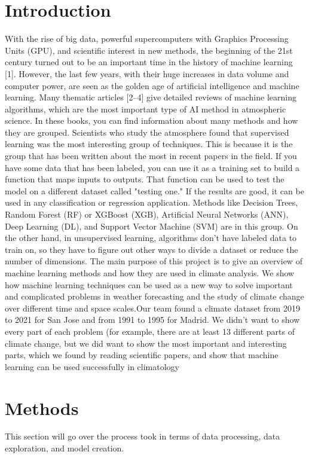 \documentclass[conference]{IEEEtran}
\begin{document}
\section{Introduction}
With the rise of big data, powerful supercomputers with Graphics Processing Units (GPU), and scientific interest in new methods, the beginning of the 21st century turned out to be an important time in the history of machine learning [1]. However, the last few years, with their huge increases in data volume and computer power, are seen as the golden age of artificial intelligence and machine learning.
Many thematic articles [2–4] give detailed reviews of machine learning algorithms, which are the most important type of AI method in atmospheric science. In these books, you can find information about many methods and how they are grouped. Scientists who study the atmosphere found that supervised learning was the most interesting group of techniques. This is because it is the group that has been written about the most in recent papers in the field. If you have some data that has been labeled, you can use it as a training set to build a function that maps inputs to outputs. That function can be used to test the model on a different dataset called "testing one." If the results are good, it can be used in any classification or regression application. Methods like Decision Trees, Random Forest (RF) or XGBoost (XGB), Artificial Neural Networks (ANN), Deep Learning (DL), and Support Vector Machine (SVM) are in this group. On the other hand, in unsupervised learning, algorithms don't have labeled data to train on, so they have to figure out other ways to divide a dataset or reduce the number of dimensions.
The main purpose of this project is to give an overview of machine learning methods and how they are used in climate analysis. We show how machine learning techniques can be used as a new way to solve important and complicated problems in weather forecasting and the study of climate change over different time and space scales.Our team found a climate dataset from 2019 to 2021 for San Jose and from 1991 to 1995 for Madrid. We didn't want to show every part of each problem (for example, there are at least 13 different parts of climate change, but we did want to show the most important and interesting parts, which we found by reading scientific papers, and show that machine learning can be used successfully in climatology

\section{Methods}
This section will go over the process took in terms of data processing, data exploration, and model creation. 
\end{document}
